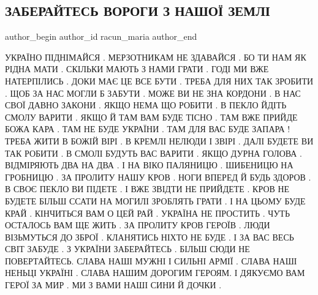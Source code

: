  
 
 
 
 
 
\subsection{ЗАБЕРАЙТЕСЬ ВОРОГИ З НАШОЇ ЗЕМЛІ}
\label{sec:18_09_2021.fb.racun_maria.1.vragi_ubirajtesj}
 
\ifcmt
 author_begin
   author_id racun_maria
 author_end
\fi


\begin{multicols}{2}
\obeycr
УКРАЇНО ПІДНІМАЙСЯ .
МЕРЗОТНИКАМ НЕ ЗДАВАЙСЯ .
БО ТИ НАМ ЯК РІДНА МАТИ .
СКІЛЬКИ МАЮТЬ З НАМИ ГРАТИ .
ГОДІ МИ ВЖЕ НАТЕРПІЛИСЬ .
ДОКИ МАЄ ЦЕ ВСЕ БУТИ .
ТРЕБА ДЛЯ НИХ ТАК ЗРОБИТИ .
ЩОБ ЗА НАС МОГЛИ Б ЗАБУТИ .
МОЖЕ ВИ НЕ ЗНА КОРДОНИ .
В НАС СВОЇ ДАВНО ЗАКОНИ .
ЯКЩО НЕМА ЩО РОБИТИ .
В ПЕКЛО ЙДІТЬ СМОЛУ ВАРИТИ .
ЯКЩО Й ТАМ ВАМ БУДЕ ТІСНО .
ТАМ ВЖЕ ПРИЙДЕ БОЖА КАРА .
ТАМ НЕ БУДЕ УКРАЇНИ .
ТАМ ДЛЯ ВАС БУДЕ ЗАПАРА !
ТРЕБА ЖИТИ В БОЖІЙ ВІРІ .
В КРЕМЛІ НЕЛЮДИ І ЗВІРІ .
ДАЛІ БУДЕТЕ ВИ ТАК РОБИТИ .
В СМОЛІ БУДУТЬ ВАС ВАРИТИ .
ЯКЩО ДУРНА ГОЛОВА .
ВІДМІРЯЮТЬ ДВА НА ДВА .
І НА ВІКО ПАЛЯНИЦЮ .
ШИБЕНИЦЮ НА ГРОБНИЦЮ .
ЗА ПРОЛИТУ НАШУ КРОВ .
НОГИ ВПЕРЕД Й БУДЬ ЗДОРОВ .
В СВОЄ ПЕКЛО ВИ ПІДЕТЕ .
І ВЖЕ ЗВІДТИ НЕ ПРИЙДЕТЕ .
КРОВ НЕ БУДЕТЕ БІЛЬШ ССАТИ 
НА МОГИЛІ ЗРОБЛЯТЬ ГРАТИ .
І НА ЦЬОМУ БУДЕ КРАЙ .
КІНЧИТЬСЯ ВАМ О ЦЕЙ РАЙ .
УКРАЇНА НЕ ПРОСТИТЬ .
ЧУТЬ ОСТАЛОСЬ ВАМ ЩЕ ЖИТЬ .
ЗА ПРОЛИТУ КРОВ ГЕРОЇВ .
ЛЮДИ ВІЗЬМУТЬСЯ ДО ЗБРОЇ .
КЛАНЯТИСЬ НІХТО НЕ БУДЕ .
І ЗА ВАС ВЕСЬ СВІТ ЗАБУДЕ .
З УКРАЇНИ ЗАБЕРАЙТЕСЬ .
БІЛЬШ СЮДИ НЕ ПОВЕРТАЙТЕСЬ.
СЛАВА НАШІ МУЖНІ І СИЛЬНІ АРМІЇ .
СЛАВА НАШІ НЕНЬЦІ УКРАЇНІ .
СЛАВА НАШИМ ДОРОГИМ ГЕРОЯМ.
І ДЯКУЄМО ВАМ ГЕРОЇ ЗА МИР .
МИ З ВАМИ НАШІ СИНИ Й ДОЧКИ .
\restorecr
\end{multicols}
